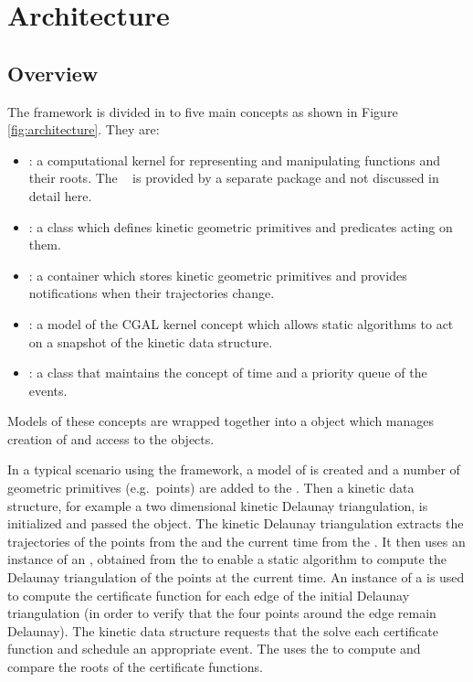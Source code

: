 
\section{Architecture}
\label{sec:architecture}


\subsection{Overview}
\label{sec:architecture_overview}

The framework is divided in to five main concepts as shown in Figure
\ref{fig:architecture}. They are:
\begin{itemize}
\item {}: a computational kernel for representing and manipulating
  functions and their roots. The ~ is provided by a separate
  package and not discussed in detail here. 
\item {}:  a class which defines kinetic geometric primitives and
  predicates acting on them.
\item {}: a container which stores kinetic geometric primitives and
  provides notifications when their trajectories change.
\item {}: a model of the CGAL kernel concept which allows static
  algorithms to act on a snapshot of the kinetic data structure.
\item {}: a class that maintains the concept of time and a priority
  queue of the events.
\end{itemize}
Models of these concepts are wrapped together into a
 object which manages creation of and access to
the objects.

In a typical scenario using the framework, a model of
 is created and a number of geometric primitives
(e.g.\ points) are added to the . Then a
kinetic data structure, for example a two dimensional kinetic Delaunay
triangulation, is initialized and passed the 
object. The kinetic Delaunay triangulation extracts the trajectories
of the points from the  and the current time
from the . It then uses an instance of an
, obtained from the  to
enable a static algorithm to compute the Delaunay triangulation of the
points at the current time. An instance of a  is
used to compute the  certificate function for each edge
of the initial Delaunay triangulation (in order to verify that the
four points around the edge remain Delaunay). The kinetic data
structure requests that the  solve each certificate
function and schedule an appropriate event. The  uses
the  to compute and compare the roots of the
certificate functions.

